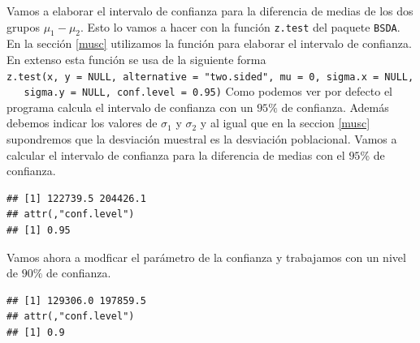 \documentclass[letterpaper,]{book}
\newenvironment{Shaded}{\begin{snugshade}}{\end{snugshade}}
\newcommand{\DataTypeTok}[1]{\textcolor[rgb]{0.13,0.29,0.53}{#1}}
\newcommand{\FloatTok}[1]{\textcolor[rgb]{0.00,0.00,0.81}{#1}}
\newcommand{\KeywordTok}[1]{\textcolor[rgb]{0.13,0.29,0.53}{\textbf{#1}}}
\newcommand{\NormalTok}[1]{#1}
\newcommand{\OperatorTok}[1]{\textcolor[rgb]{0.81,0.36,0.00}{\textbf{#1}}}
\begin{document}
Vamos a elaborar el intervalo de confianza para la diferencia de medias de los dos grupos \(\mu_1-\mu_2\). Esto lo vamos a hacer con la función \texttt{z.test} del paquete \texttt{BSDA}. En la sección \ref{musc} utilizamos la función para elaborar el intervalo de confianza. En extenso esta función se usa de la siguiente forma \texttt{z.test(x,\ y\ =\ NULL,\ alternative\ =\ "two.sided",\ mu\ =\ 0,\ sigma.x\ =\ NULL,\ \ \ sigma.y\ =\ NULL,\ conf.level\ =\ 0.95)} Como podemos ver por defecto el programa calcula el intervalo de confianza con un \(95\%\) de confianza. Además debemos indicar los valores de \(\sigma_1\) y \(\sigma_2\) y al igual que en la seccion \ref{musc} supondremos que la desviación muestral es la desviación poblacional. Vamos a calcular el intervalo de confianza para la diferencia de medias con el \(95\)\% de confianza.

\begin{Shaded}
\end{Shaded}

\begin{verbatim}
## [1] 122739.5 204426.1
## attr(,"conf.level")
## [1] 0.95
\end{verbatim}

Vamos ahora a modficar el parámetro de la confianza y trabajamos con un nivel de \(90\%\) de confianza.

\begin{Shaded}
\end{Shaded}

\begin{verbatim}
## [1] 129306.0 197859.5
## attr(,"conf.level")
## [1] 0.9
\end{verbatim}
\end{document}
